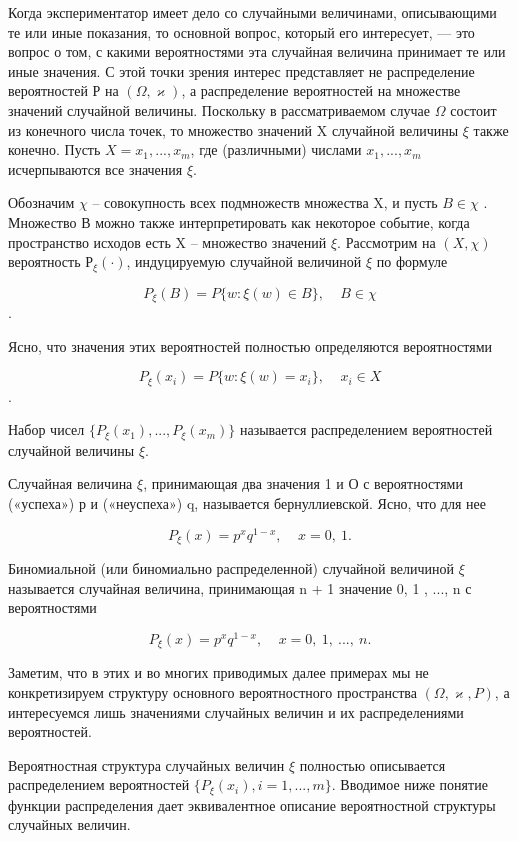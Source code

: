 Когда экспериментатор имеет дело со случайными величинами, описывающими те или иные показания, то основной вопрос, который его интересует, — это вопрос о том, с какими вероятностями эта случайная величина принимает те или иные значения. С этой точки зрения интерес представляет не распределение вероятностей Р на $(\Omega, \varkappa)$, а распределение вероятностей на множестве значений случайной величины. Поскольку в рассматриваемом случае $\Omega$ состоит из конечного числа точек, то множество значений X случайной величины $\xi$ также конечно. Пусть $X = {x_1, ..., x_m}$, где (различными) числами $x_1, ..., x_m$ исчерпываются все значения $\xi$.

Обозначим $\chi$ -- совокупность всех подмножеств множества X, и пусть $B \in \chi$ . Множество В можно также интерпретировать как некоторое событие, когда пространство исходов есть X -- множество значений $\xi$.
Рассмотрим на $(X, \chi )$ вероятность $Р_{\xi}(\cdot)$, индуцируемую случайной величиной $\xi$ по формуле

$$P_{\xi} (B) = P\{ w: \xi(w) \in B\}, \ \ \ \ \ B \in \chi$$.

Ясно, что значения этих вероятностей полностью определяются вероятностями

$$P_{\xi} (x_i) = P\{ w: \xi(w) = x_i\}, \ \ \ \ \ x_i \in X$$.

Набор чисел $\{ P_{\xi} (x_1), ..., P_{\xi} (x_m)\}$ называется распределением вероятностей случайной величины $\xi$.

\begin{example} Случайная величина $\xi$, принимающая два значения 1 и О с вероятностями («успеха») р и («неуспеха») q, называется бернуллиевской. Ясно, что для нее

$$P_{\xi} (x) = p^xq^{1-x}, \ \ \ \ \ x = 0, \ 1.$$

Биномиальной (или биномиально распределенной) случайной величиной $\xi$ называется случайная величина, принимающая n + 1 значение 0, 1 , ..., n с вероятностями

$$P_{\xi} (x) = p^xq^{1-x}, \ \ \ \ \ x = 0, \ 1, \ ..., \ n.$$
\end{example}

Заметим, что в этих и во многих приводимых далее примерах мы не конкретизируем структуру основного вероятностного пространства $(\Omega, \varkappa, P)$, а интересуемся лишь значениями случайных величин и их распределениями вероятностей.

Вероятностная структура случайных величин $\xi$ полностью описывается распределением вероятностей $\{ P_{\xi}(x_i), i = 1, ..., m\}$. Вводимое ниже понятие функции распределения дает эквивалентное описание вероятностной структуры случайных величин.

